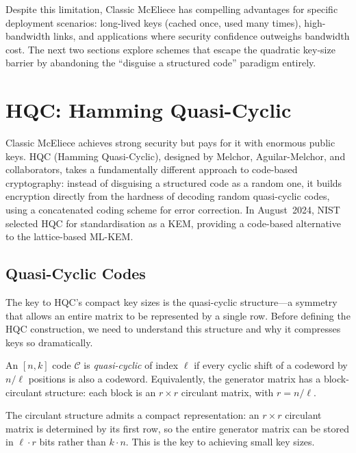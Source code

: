 Despite this limitation, Classic McEliece has compelling advantages for specific deployment scenarios: long-lived keys (cached once, used many times), high-bandwidth links, and applications where security confidence outweighs bandwidth cost.  The next two sections explore schemes that escape the quadratic key-size barrier by abandoning the ``disguise a structured code'' paradigm entirely.


\section{HQC: Hamming Quasi-Cyclic}
\label{sec:hqc}

Classic McEliece achieves strong security but pays for it with enormous public keys.  HQC (Hamming Quasi-Cyclic), designed by Melchor, Aguilar-Melchor, and collaborators, takes a fundamentally different approach to code-based cryptography: instead of disguising a structured code as a random one, it builds encryption directly from the hardness of decoding random quasi-cyclic codes, using a concatenated coding scheme for error correction.  In August~2024, NIST selected HQC for standardisation as a KEM, providing a code-based alternative to the lattice-based ML-KEM.

\subsection{Quasi-Cyclic Codes}
\label{subsec:qc-codes}

The key to HQC's compact key sizes is the quasi-cyclic structure---a symmetry that allows an entire matrix to be represented by a single row.  Before defining the HQC construction, we need to understand this structure and why it compresses keys so dramatically.

\begin{definition}
\label{def:qc-code}
An $[n, k]$ code $\mathcal{C}$ is \emph{quasi-cyclic} of index $\ell$ if every cyclic shift of a codeword by $n/\ell$ positions is also a codeword.  Equivalently, the generator matrix has a block-circulant structure: each block is an $r \times r$ circulant matrix, with $r = n/\ell$.
\end{definition}

The circulant structure admits a compact representation: an $r \times r$ circulant matrix is determined by its first row, so the entire generator matrix can be stored in $\ell \cdot r$ bits rather than $k \cdot n$.  This is the key to achieving small key sizes.


